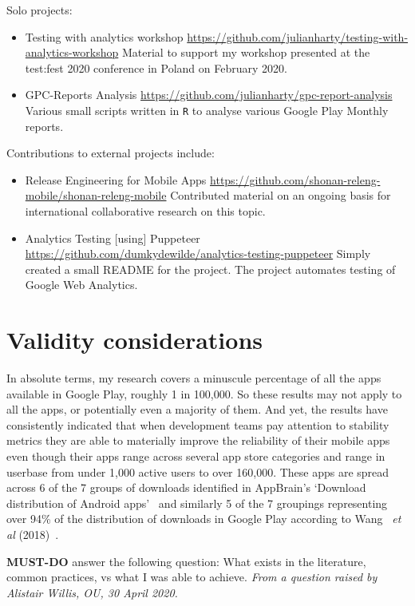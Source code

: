 Solo projects:
\begin{itemize}
    \item Testing with analytics workshop \url{https://github.com/julianharty/testing-with-analytics-workshop} Material to support my workshop presented at the test:fest 2020 conference in Poland on  February 2020.
    \item GPC-Reports Analysis \url{https://github.com/julianharty/gpc-report-analysis} Various small scripts written in \texttt{R} to analyse various Google Play Monthly reports.
\end{itemize}

Contributions to external projects include:
\begin{itemize}
    \item Release Engineering for Mobile Apps \url{https://github.com/shonan-releng-mobile/shonan-releng-mobile} Contributed material on an ongoing basis for international collaborative research on this topic. 
    \item Analytics Testing [using] Puppeteer \url{https://github.com/dumkydewilde/analytics-testing-puppeteer} Simply created a small README for the project. The project automates testing of Google Web Analytics.
\end{itemize}

\section{Validity considerations}
In absolute terms, my research covers a minuscule percentage of all the apps available in Google Play, roughly 1 in 100,000. So these results may not apply to all the apps, or potentially even a majority of them. And yet, the results have consistently indicated that when development teams pay attention to stability metrics they are able to materially improve the reliability of their mobile apps even though their apps range across several app store categories and range in userbase from under 1,000 active users to over 160,000. These apps are spread across 6 of the 7 groups of downloads identified in AppBrain's `Download distribution of Android apps'~\cite{appbrain_download_statistics_june_2019} and similarly 5 of the 7 groupings representing over 94\% of the distribution of downloads in Google Play according to Wang ~\emph{et al} (2018)~\cite{wang2018beyond}.

\textbf{MUST-DO} answer the following question: What exists in the literature, common practices, vs what I was able to achieve. \emph{From a question raised by Alistair Willis, OU, 30 April 2020.}

